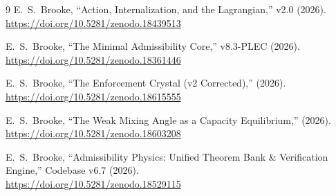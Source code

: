 \documentclass[11pt]{article}
\begin{document}
\begin{thebibliography}{9}
E.\ S.\ Brooke, ``Action, Internalization, and the Lagrangian,''
v2.0 (2026). \\
\url{https://doi.org/10.5281/zenodo.18439513}

E.\ S.\ Brooke, ``The Minimal Admissibility Core,''
v8.3-PLEC (2026). \\
\url{https://doi.org/10.5281/zenodo.18361446}

E.\ S.\ Brooke, ``The Enforcement Crystal (v2 Corrected),''
(2026). \\
\url{https://doi.org/10.5281/zenodo.18615555}

E.\ S.\ Brooke, ``The Weak Mixing Angle as a Capacity Equilibrium,''
(2026). \\
\url{https://doi.org/10.5281/zenodo.18603208}

E.\ S.\ Brooke, ``Admissibility Physics: Unified Theorem Bank \& Verification Engine,''
Codebase v6.7 (2026). \\
\url{https://doi.org/10.5281/zenodo.18529115}

\end{thebibliography}
\end{document}
